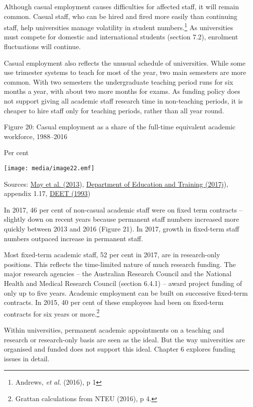 \documentclass[]{book}
\begin{document}
Although casual employment causes difficulties for affected staff, it will remain common. Casual staff, who can be hired and fired more easily than continuing staff, help universities manage volatility in student numbers.\footnote{Andrews\emph{, et al.} (2016), p 1} As universities must compete for domestic and international students (section 7.2), enrolment fluctuations will continue.

Casual employment also reflects the unusual schedule of universities. While some use trimester systems to teach for most of the year, two main semesters are more common. With two semesters the undergraduate teaching period runs for six months a year, with about two more months for exams. As funding policy does not support giving all academic staff research time in non-teaching periods, it is cheaper to hire staff only for teaching periods, rather than all year round.

\protect\hypertarget{_Ref518737511}{}{}Figure 20: Casual employment as a share of the full-time equivalent academic workforce, 1988--2016

Per cent

\texttt{[image: media/image22.emf]}

Sources: \protect\hyperlink{_ENREF_141}{May et al. (2013}), \protect\hyperlink{_ENREF_76}{Department of Education and Training (2017j}), appendix 1.17, \protect\hyperlink{_ENREF_56}{DEET (1993})

In 2017, 46 per cent of non-casual academic staff were on fixed term contracts -- slightly down on recent years because permanent staff numbers increased more quickly between 2013 and 2016 (Figure 21). In 2017, growth in fixed-term staff numbers outpaced increase in permanent staff.

Most fixed-term academic staff, 52 per cent in 2017, are in research-only positions. This reflects the time-limited nature of much research funding. The major research agencies -- the Australian Research Council and the National Health and Medical Research Council (section 6.4.1) -- award project funding of only up to five years. Academic employment can be built on successive fixed-term contracts. In 2015, 40 per cent of these employees had been on fixed-term contracts for six years or more.\footnote{Grattan calculations from NTEU (2016), p 4.}

Within universities, permanent academic appointments on a teaching and research or research-only basis are seen as the ideal. But the way universities are organised and funded does not support this ideal. Chapter 6 explores funding issues in detail.
\end{document}
